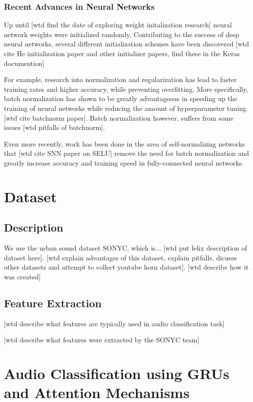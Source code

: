 \documentclass[a4paper,11pt,twoside]{scrbook}
\begin{document}
\subsection{Recent Advances in Neural Networks}

Up until [wtd find the date of exploring weight initalization research] neural network weights were initialized randomly.  Contributing to the success of deep neural networks, several different initialization schemes have been discovered [wtd cite He initialization paper and other initializer papers, find these in the Keras documention]

For example, research into normalization and regularization has lead to faster training rates and higher accuracy, while preventing overfitting.  More specifically, batch normalization has shown to be greatly advantageous in speeding up the training of neural networks while reducing the amount of hyperparameter tuning [wtd cite batchnorm paper].  Batch normalization however, suffers from some issues [wtd pitfalls of batchnorm].

Even more recently, work has been done in the area of self-normalizing networks that [wtd cite SNN paper on SELU] remove the need for batch normalization and greatly increase accuracy and training speed in fully-connected neural networks.
  
\chapter{Dataset}

\section{Description}

We use the urban sound dataset SONYC, which is... [wtd put felix description of dataset here]. [wtd explain advantages of this dataset, explain pitfalls, dicusss other datasets and attempt to collect youtube horn dataset].  [wtd describe how it was created]

\section{Feature Extraction}

[wtd describe what features are typically used in audio classification task]

[wtd describe what features were extracted by the SONYC team]

\chapter{Audio Classification using GRUs and Attention Mechanisms}
\end{document}
